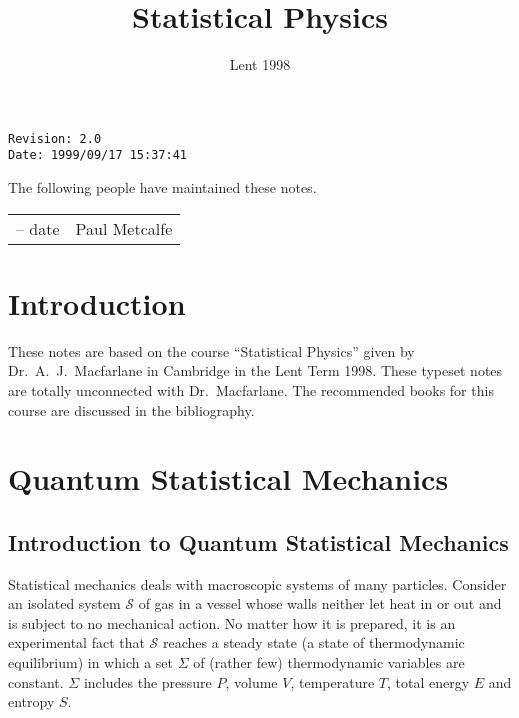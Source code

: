 \documentclass{notes}
\newcommand{\cS}{\mathcal{S}}
\begin{document}
\frontmatter

\title{Statistical Physics}

\date{Lent 1998} \maketitle

\thispagestyle{empty}
\noindent\verb$Revision: 2.0 $\hfill\\
\noindent\verb$Date: 1999/09/17 15:37:41 $\hfill

\vspace{1.5in}

The following people have maintained these notes.

\begin{center}
\begin{tabular}{ r  l}
-- date & Paul Metcalfe
\end{tabular}
\end{center}

\tableofcontents

\chapter{Introduction}

These notes are based on the course ``Statistical Physics'' given by
Dr.~A.~J.~Macfarlane in Cambridge in the Lent Term 1998.  These
typeset notes are totally unconnected with Dr.~Macfarlane.  The
recommended books for this course are discussed in the bibliography.

\alsoavailable
\archimcopyright

\mainmatter

\chapter{Quantum Statistical Mechanics}

\section{Introduction to Quantum Statistical Mechanics}

Statistical mechanics deals with macroscopic systems of many particles.
Consider an isolated system $\cS$ of gas in a vessel whose walls neither
let heat in or out and is subject to no mechanical action.  No matter
how it is prepared, it is an experimental fact that $\cS$ reaches a steady
state (a state of thermodynamic equilibrium) in which a set $\Sigma$
of (rather few) thermodynamic variables are constant.  $\Sigma$
includes the pressure $P$, volume $V$, temperature $T$, total energy
$E$ and entropy $S$.
\end{document}
